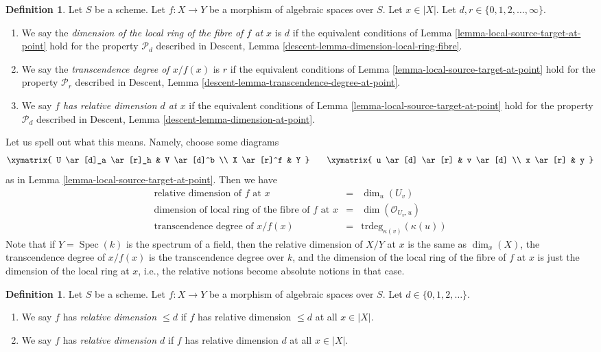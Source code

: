 \documentclass{stacks-project}
\theoremstyle{plain}
\theoremstyle{definition}
\newtheorem{definition}[subsection]{Definition}
\theoremstyle{remark}
\numberwithin{equation}{subsection}
\def\Spec{\mathop{\mathrm{Spec}}}
\begin{document}
\begin{definition}
\label{definition-dimension-fibre}
Let $S$ be a scheme.
Let $f : X \to Y$ be a morphism of algebraic spaces over $S$.
Let $x \in |X|$.
Let $d, r \in \{0, 1, 2, \ldots, \infty\}$.
\begin{enumerate}
\item We say the
{\it dimension of the local ring of the fibre of $f$ at $x$} is $d$
if the equivalent conditions of
Lemma \ref{lemma-local-source-target-at-point}
hold for the property
$\mathcal{P}_d$ described in
Descent, Lemma \ref{descent-lemma-dimension-local-ring-fibre}.
\item We say the
{\it transcendence degree of $x/f(x)$} is $r$
if the equivalent conditions of
Lemma \ref{lemma-local-source-target-at-point}
hold for the property
$\mathcal{P}_r$ described in
Descent, Lemma \ref{descent-lemma-transcendence-degree-at-point}.
\item We say
{\it $f$ has relative dimension $d$ at $x$}
if the equivalent conditions of
Lemma \ref{lemma-local-source-target-at-point}
hold for the property
$\mathcal{P}_d$ described in
Descent, Lemma \ref{descent-lemma-dimension-at-point}.
\end{enumerate}
\end{definition}

\noindent
Let us spell out what this means. Namely, choose some
diagrams
$$
\xymatrix{
U \ar[d]_a \ar[r]_h & V \ar[d]^b \\
X \ar[r]^f & Y
}
\quad\quad
\xymatrix{
u \ar[d] \ar[r] & v \ar[d] \\
x \ar[r] & y
}
$$
as in
Lemma \ref{lemma-local-source-target-at-point}.
Then we have
$$
\begin{matrix}
\text{relative dimension of }f\text{ at }x & = &
\dim_u (U_v) \\
\text{dimension of local ring of the fibre of }f\text{ at }x & = &
\dim(\mathcal{O}_{U_v, u})\\
\text{transcendence degree of }x/f(x) & = &
\text{trdeg}_{\kappa(v)}(\kappa(u))
\end{matrix}
$$
Note that if $Y = \Spec(k)$ is the spectrum of a field, then
the relative dimension of $X/Y$ at $x$ is the same as $\dim_x(X)$,
the transcendence degree of $x/f(x)$ is the transcendence degree
over $k$, and the dimension of the local ring of the fibre of $f$
at $x$ is just the dimension of the local ring at $x$, i.e., the
relative notions become absolute notions in that case.

\begin{definition}
\label{definition-relative-dimension}
Let $S$ be a scheme.
Let $f : X \to Y$ be a morphism of algebraic spaces over $S$.
Let $d \in \{0, 1, 2, \ldots\}$.
\begin{enumerate}
\item We say $f$ has {\it relative dimension $\leq d$} if
$f$ has relative dimension $\leq d$ at all $x \in |X|$.
\item We say $f$ has {\it relative dimension $d$} if
$f$ has relative dimension $d$ at all $x \in |X|$.
\end{enumerate}
\end{definition}
\end{document}
